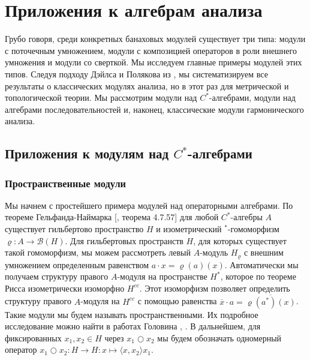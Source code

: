 
\chapter{Приложения к алгебрам анализа} %

\label{ChapterApplicationsToAlgebrasOfAnalysis} %

Грубо говоря, среди конкретных банаховых модулей существует три типа: модули с поточечным умножением, модули с композицией операторов в роли внешнего умножения и модули со сверткой. Мы исследуем главные примеры модулей этих типов. Следуя подходу Дэйлса и Полякова из \cite{DalPolHomolPropGrAlg}, мы систематизируем все результаты о классических модулях анализа, но в этот раз для метрической и топологической теории. Мы рассмотрим модули над $C^*$-алгебрами, модули над алгебрами последовательностей и, наконец, классические модули гармонического анализа.



\section{Приложения к модулям над \texorpdfstring{$C^*$}{C*}-алгебрами}
\label{SectionApplicationsToCStarAlgebras}


\subsection{Пространственные модули}
\label{SubSectionSpatialModules}

Мы начнем с простейшего примера модулей над операторными алгебрами. По теореме Гельфанда-Наймарка [\cite{HelBanLocConvAlg}, теорема 4.7.57] для любой $C^*$-алгебры $A$ существует гильбертово пространство $H$ и изометрический ${}^*$-гомоморфизм $\varrho:A\to\mathcal{B}(H)$. Для гильбертовых пространств $H$, для которых существует такой гомоморфизм, мы можем рассмотреть  левый $A$-модуль $H_\varrho$ с внешним умножением определенным равенством $a\cdot x=\varrho(a)(x)$. Автоматически мы получаем структуру правого $A$-модуля на пространстве $H^*$, которое по теореме Рисса изометрически изоморфно $H^{cc}$. Этот изоморфизм позволяет определить структуру правого $A$-модуля на $H^{cc}$ с помощью равенства $\overline{x}\cdot a=\overline{\varrho(a^*)(x)}$. Такие модули мы будем называть пространственными. Их подробное исследование можно найти в работах Головина \cite{GolovibHomolPropHilbModOverNestOpAlg}, \cite{GolovinSpatProjPropInClOfCSLAlg}. В дальнейшем, для фиксированных $x_1,x_2\in H$ через $x_1\bigcirc x_2$ мы будем обозначать одномерный оператор $x_1\bigcirc x_2:H\to H:x\mapsto \langle x, x_2\rangle x_1$. 

